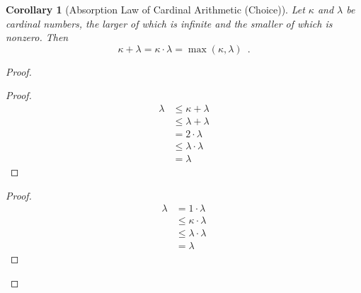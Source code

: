 \documentclass{article}
\let\qed\relax
\newtheorem{corollary}{Corollary}[axiom]
\theoremstyle{definition}
\begin{document}
    \begin{corollary}[Absorption Law of Cardinal Arithmetic (Choice)]
        Let $\kappa$ and $\lambda$ be cardinal numbers, the larger of which is infinite and the smaller of
        which is nonzero. Then
        \[ \kappa + \lambda = \kappa \cdot \lambda = \max(\kappa, \lambda) \enspace . \]
    \end{corollary}

    \begin{proof}
        \pf
        \begin{proof}
            \pf
            \begin{align*}
                \lambda & \leq \kappa + \lambda \\
                & \leq \lambda + \lambda \\
                & = 2 \cdot \lambda \\
                & \leq \lambda \cdot \lambda \\
                & = \lambda
            \end{align*}
        \end{proof}
        \begin{proof}
            \pf
            \begin{align*}
                \lambda & = 1 \cdot \lambda \\
                & \leq \kappa \cdot \lambda \\
                & \leq \lambda \cdot \lambda \\
                & = \lambda
            \end{align*}
        \end{proof}
        \qed
    \end{proof}
\end{document}
